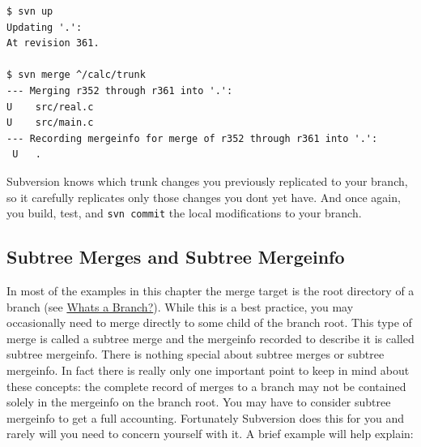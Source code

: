 \begin{verbatim}
$ svn up
Updating '.':
At revision 361.

$ svn merge ^/calc/trunk
--- Merging r352 through r361 into '.':
U    src/real.c
U    src/main.c
--- Recording mergeinfo for merge of r352 through r361 into '.':
 U   .
\end{verbatim}

Subversion knows which trunk changes you previously replicated to your
branch, so it carefully replicates only those changes you
don\textquotesingle t yet have. And once again, you build, test, and
\texttt{svn\ commit} the local modifications to your branch.

\subsection{Subtree Merges and Subtree
Mergeinfo}\label{svn.branchmerge.basicmerging.stayinsync.subtree}

In most of the examples in this chapter the merge target is the root
directory of a branch (see
\hyperref[svn.branchmerge.whatis]{What\textquotesingle s a Branch?}).
While this is a best practice, you may occasionally need to merge
directly to some child of the branch root. This type of merge is called
a subtree merge and the mergeinfo recorded to describe it is called
subtree mergeinfo. There is nothing special about subtree merges or
subtree mergeinfo. In fact there is really only one important point to
keep in mind about these concepts: the complete record of merges to a
branch may not be contained solely in the mergeinfo on the branch root.
You may have to consider subtree mergeinfo to get a full accounting.
Fortunately Subversion does this for you and rarely will you need to
concern yourself with it. A brief example will help explain:

